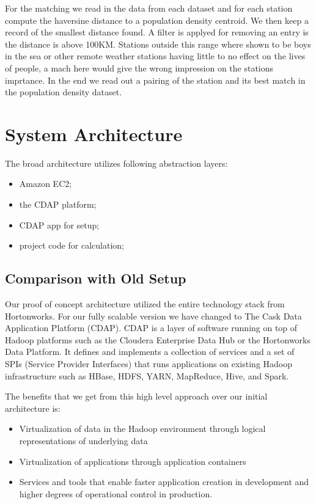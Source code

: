 \documentclass[
10pt, %
a4paper, %
oneside, %
headinclude,footinclude, %
useAMS,
usenatbib
]{mn2e}  %
\begin{document}
For the matching we read in the data from each dataset and for each station compute the haversine distance to a population density centroid. We then keep a record of the smallest distance found. A filter is applyed for removing an entry is the distance is above 100KM. Stations outside this range where shown to be boys in the sea or other remote weather stations having little to no effect on the lives of people, a mach here would give the wrong impression on the stations imprtance. In the end we read out a pairing of the station and its best match in the population density dataset.

\section{System Architecture}
The broad architecture utilizes following abstraction layers:
\begin{itemize}
\item Amazon EC2;
\item the CDAP platform;
\item CDAP app for setup;
\item project code for calculation;
\end{itemize}


\subsection{Comparison with Old Setup}
Our proof of concept architecture utilized the entire technology stack from Hortonworks. For our fully scalable version we have changed to The Cask Data Application Platform (CDAP). CDAP is a layer of software running on top of Hadoop platforms such as the Cloudera Enterprise Data Hub or the Hortonworks Data Platform. It defines and implements a collection of services and a set of SPIs (Service Provider Interfaces) that runs applications on existing Hadoop infrastructure such as HBase, HDFS, YARN, MapReduce, Hive, and Spark.

The benefits that we get from this high level approach over our initial architecture is:
\begin{itemize}
    \item Virtualization of data in the Hadoop environment through logical representations of underlying data
    \item Virtualization of applications through application containers
    \item Services and tools that enable faster application creation in development and higher degrees of operational control in production.
\end{itemize}
\end{document}
